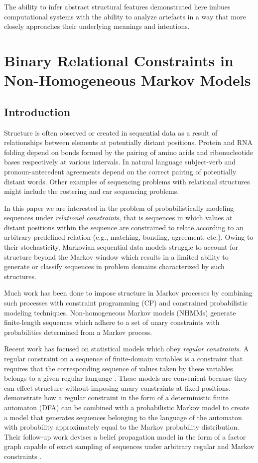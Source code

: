 \documentclass[phd,electronic,oneside,twosidetoc,letterpaper,chaptercenter,parttop,lof,lot]{byumsphd}
\begin{document}
The ability to infer abstract structural features demonstrated here imbues computational systems with the ability to analyze artefacts in a way that more closely approaches their underlying meanings and intentions.

\chapter{Binary Relational Constraints in Non-Homogeneous Markov Models}

\section{Introduction}

Structure is often observed or created in sequential data as a result of relationships between elements at potentially distant positions. Protein and RNA folding depend on bonds formed by the pairing of amino acids and ribonucleotide bases respectively at various intervals. In natural language subject-verb and pronoun-antecedent agreements depend on the correct pairing of potentially distant words. Other examples of sequencing problems with relational structures might include the rostering and car sequencing problems.

In this paper we are interested in the problem of probabilistically modeling sequences under \textit{relational constraints}, that is sequences in which values at distant positions within the sequence are constrained to relate according to an arbitrary predefined relation (e.g., matching, bonding, agreement, etc.). Owing to their stochasticity, Markovian sequential data models struggle to account for structure beyond the Markov window which results in a limited ability to generate or classify sequences in problem domains characterized by such structures. 

Much work has been done to impose structure in Markov processes by combining such processes with constraint programming (CP) and constrained probabilistic modeling techniques. Non-homogeneous Markov models (NHMMs) \cite{pachet2011finite} generate finite-length sequences which adhere to a set of unary constraints with probabilities determined from a Markov process.

Recent work has focused on statistical models which obey \textit{regular constraints}. A regular constraint on a sequence of finite-domain variables is a constraint that requires that the corresponding sequence of values taken by these variables belongs to a given regular language \cite{pesant2004regular}. These models are convenient because they can effect structure without imposing unary constraints at fixed positions. \citeauthor{papadopoulos2014avoiding} \cite{papadopoulos2014avoiding} demonstrate how a regular constraint in the form of a deterministic finite automaton (DFA) can be combined with a probabilistic Markov model to create a model that generates sequences belonging to the language of the automaton with probability approximately equal to the Markov probability distribution. Their follow-up work devises a belief propagation model in the form of a factor graph capable of exact sampling of sequences under arbitrary regular and Markov constraints \cite{papadopoulos2015exact}.
\end{document}

